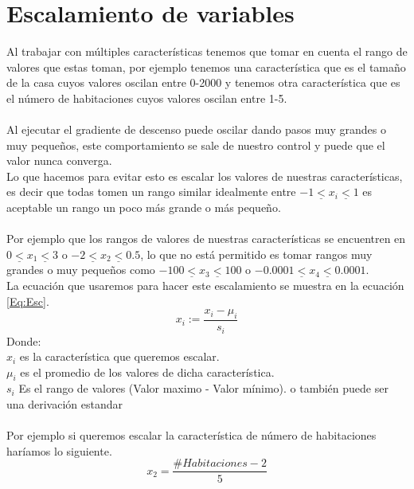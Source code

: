 \documentclass{report}
\begin{document}
\section{Escalamiento de variables}
Al trabajar con múltiples características tenemos que tomar en cuenta el rango de valores que estas toman, por ejemplo tenemos una característica que es el tamaño de la casa cuyos valores oscilan entre 0-2000 y tenemos otra característica que es el número de habitaciones cuyos valores oscilan entre 1-5.\\\\Al ejecutar el gradiente de descenso puede oscilar dando pasos muy grandes o muy pequeños, este comportamiento se sale de nuestro control y puede que el valor nunca converga.\\Lo que hacemos para evitar esto es escalar los valores de nuestras características, es decir que todas tomen un rango similar idealmente entre $-1\underline{<} x_i \underline{<}1$ es aceptable un rango un poco más grande o más pequeño. \\\\Por ejemplo que los rangos de valores de nuestras características se encuentren en $0\underline{<}x_1\underline{<}3$ o $-2\underline{<}x_2\underline{<}0.5$, lo que no está permitido es tomar rangos muy grandes o muy pequeños como $-100\underline{<}x_3\underline{<}100$ o $-0.0001\underline{<}x_4\underline{<}0.0001$.\\La ecuación que usaremos para hacer este escalamiento se muestra en la ecuación \ref{Eq:Esc}.
\begin{equation}
	x_i:=\frac{x_i-\mu_i}{s_i}
	\label{Eq:Esc}
\end{equation}
Donde:\\$x_i$ es la característica que queremos escalar.\\$\mu_i$ es el promedio de los valores de dicha característica.\\
$s_i$ Es el rango de valores (Valor maximo - Valor mínimo). o también puede ser una derivación estandar\\\\Por ejemplo si queremos escalar la característica de número de habitaciones haríamos lo siguiente.
\[
x_2=\frac{\#Habitaciones-2}{5}
\]
\end{document}
